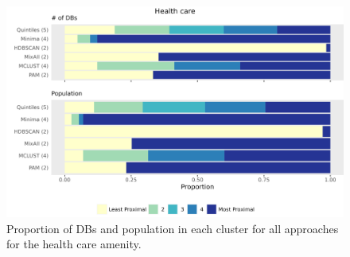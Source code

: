 \documentclass[11pt, a4paper]{article}
\begin{document}
\begin{figure}[H]
\centering
\includegraphics[width=\textwidth]{./barplot_comparison/Health care_barplot.png}
\caption[Health care profile barplot]{Proportion of DBs and population in each cluster for all approaches for the health care amenity.}\label{healthcarebarplot}
\end{figure}





\centering
\begin{table}[H]
\centering
\caption[Health care validation metrics]{The validation metric values for each clustering approach for the health care amenity.}\label{healthcarevalid}
\end{table}
\end{document}
